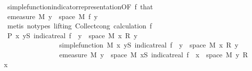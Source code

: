 \begin{isabellebody}
\ simple{\isacharunderscore}{\kern0pt}function{\isacharunderscore}{\kern0pt}indicator{\isacharunderscore}{\kern0pt}representation{\isacharbrackleft}{\kern0pt}OF\ f{\isacharparenleft}{\kern0pt}{}{\isacharparenright}{\kern0pt}\ that{\isacharbrackright}{\kern0pt}\ \isacommand{{\isachardot}{\kern0pt}}\isamarkupfalse%
\isanewline
\ \ \isamarkupfalse%
\ \isamarkupfalse%
\ {\isachardoublequoteopen}emeasure\ M\ {\isacharbraceleft}{\kern0pt}y\ {\isasymin}\ space\ M{\isachardot}{\kern0pt}\ {\isacharquery}{\kern0pt}f\ y\ {\isasymnoteq}\ {}{\isacharbraceright}{\kern0pt}\ {\isasymnoteq}\ {\isasyminfinity}{\isachardoublequoteclose}\ \isamarkupfalse%
\ {\isacharparenleft}{\kern0pt}metis\ {\isacharparenleft}{\kern0pt}no{\isacharunderscore}{\kern0pt}types{\isacharcomma}{\kern0pt}\ lifting{\isacharparenright}{\kern0pt}\ Collect{\isacharunderscore}{\kern0pt}cong\ calculation\ f{\isacharparenleft}{\kern0pt}{}{\isacharparenright}{\kern0pt}{\isacharparenright}{\kern0pt}\isanewline
\ \ \isamarkupfalse%
\ \isamarkupfalse%
\ {\isachardoublequoteopen}P\ {\isacharparenleft}{\kern0pt}{\isasymlambda}x{\isachardot}{\kern0pt}\ {\isasymSum}y{\isasymin}S{\isachardot}{\kern0pt}\ indicat{\isacharunderscore}{\kern0pt}real\ {\isacharparenleft}{\kern0pt}f\ {\isacharminus}{\kern0pt}{\isacharbackquote}{\kern0pt}\ {\isacharbraceleft}{\kern0pt}y{\isacharbraceright}{\kern0pt}\ {\isasyminter}\ space\ M{\isacharparenright}{\kern0pt}\ x\ {\isacharasterisk}{\kern0pt}\isactrlsub R\ y{\isacharparenright}{\kern0pt}{\isachardoublequoteclose}\isanewline
\ \ \ \ \ \ \ \ \ \ \ \ \ \ \ \ {\isachardoublequoteopen}simple{\isacharunderscore}{\kern0pt}function\ M\ {\isacharparenleft}{\kern0pt}{\isasymlambda}x{\isachardot}{\kern0pt}\ {\isasymSum}y{\isasymin}S{\isachardot}{\kern0pt}\ indicat{\isacharunderscore}{\kern0pt}real\ {\isacharparenleft}{\kern0pt}f\ {\isacharminus}{\kern0pt}{\isacharbackquote}{\kern0pt}\ {\isacharbraceleft}{\kern0pt}y{\isacharbraceright}{\kern0pt}\ {\isasyminter}\ space\ M{\isacharparenright}{\kern0pt}\ x\ {\isacharasterisk}{\kern0pt}\isactrlsub R\ y{\isacharparenright}{\kern0pt}{\isachardoublequoteclose}\isanewline
\ \ \ \ \ \ \ \ \ \ \ \ \ \ \ \ {\isachardoublequoteopen}emeasure\ M\ {\isacharbraceleft}{\kern0pt}y\ {\isasymin}\ space\ M{\isachardot}{\kern0pt}\ {\isacharparenleft}{\kern0pt}{\isasymSum}x{\isasymin}S{\isachardot}{\kern0pt}\ indicat{\isacharunderscore}{\kern0pt}real\ {\isacharparenleft}{\kern0pt}f\ {\isacharminus}{\kern0pt}{\isacharbackquote}{\kern0pt}\ {\isacharbraceleft}{\kern0pt}x{\isacharbraceright}{\kern0pt}\ {\isasyminter}\ space\ M{\isacharparenright}{\kern0pt}\ y\ {\isacharasterisk}{\kern0pt}\isactrlsub R\ x{\isacharparenright}{\kern0pt}\ {\isasymnoteq}\ {}{\isacharbraceright}{\kern0pt}\ {\isasymnoteq}\ {\isasyminfinity}{\isachardoublequoteclose}\isanewline

\end{isabellebody}
